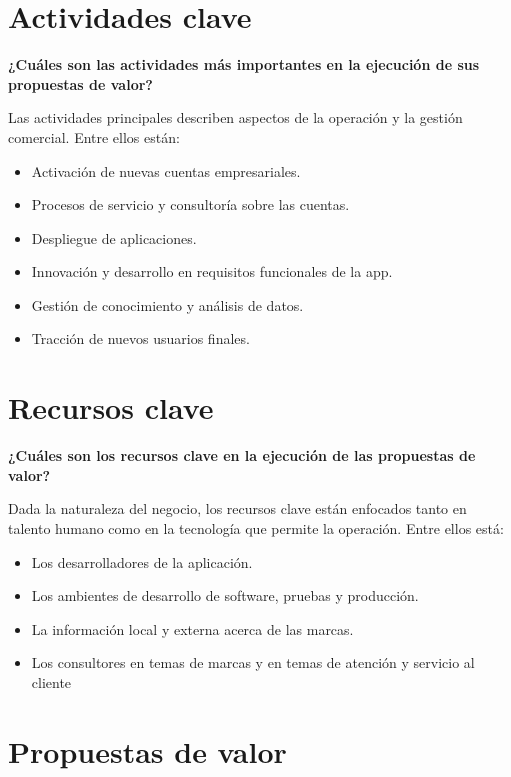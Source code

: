 \section{Actividades clave}

\textbf{¿Cuáles son las actividades más importantes en la ejecución de sus propuestas de valor?}

Las actividades principales describen aspectos de la operación y la gestión comercial. Entre ellos están:

\begin{itemize}
    \item Activación de nuevas cuentas empresariales.
    \item Procesos de servicio y consultoría sobre las cuentas.
    \item Despliegue de aplicaciones.
    \item Innovación y desarrollo en requisitos funcionales de la app.
    \item Gestión de conocimiento y análisis de datos.
    \item Tracción de nuevos usuarios finales.
\end{itemize}   

\section{Recursos clave}

\textbf{¿Cuáles son los recursos clave en la ejecución de las propuestas de valor?}

Dada la naturaleza del negocio, los recursos clave están enfocados tanto en talento humano como en la tecnología que permite la operación. Entre ellos está: 

\begin{itemize}
    \item Los desarrolladores de la aplicación.
    \item Los ambientes de desarrollo de software, pruebas y producción.
    \item La información local y externa acerca de las marcas.
    \item Los consultores en temas de marcas y en temas de atención y servicio al cliente
\end{itemize}   

\section{Propuestas de valor}

